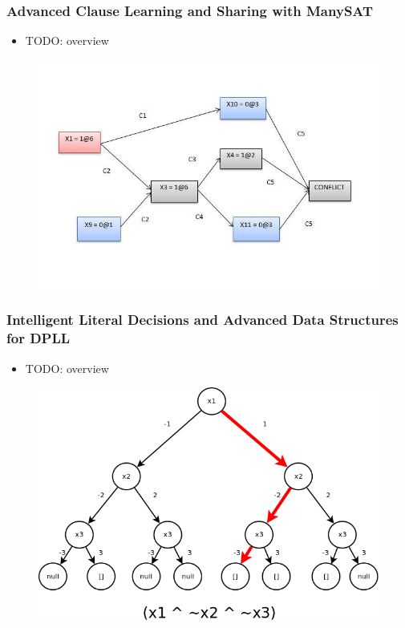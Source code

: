 \documentclass[handout]{beamer}
\begin{document}
\begin{frame}
	\frametitle{Advanced Clause Learning and Sharing with ManySAT}
	\begin{itemize}
		\item TODO: overview
	\end{itemize}
\begin{figure}
\centering
\includegraphics[scale = 0.35]{implication.jpg}
\end{figure}
\end{frame}

\begin{frame}
	\frametitle{Intelligent Literal Decisions and Advanced Data Structures for DPLL}
	\begin{itemize}
		\item TODO: overview
	\end{itemize}
\begin{figure}
\centering
\includegraphics[scale = 0.35]{trie.png}
\end{figure}
\end{frame}
\end{document}
